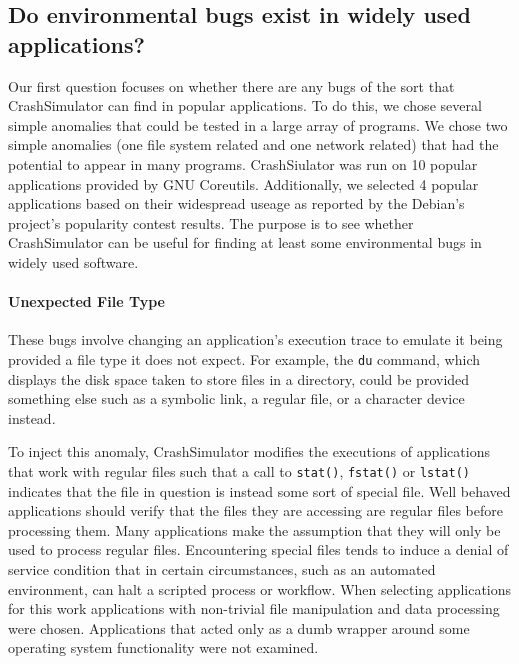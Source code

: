 \subsection{Do environmental bugs  exist in widely used applications?}

Our first question focuses on whether there are any bugs of the sort that
CrashSimulator can find in popular applications.  To do this, we 
chose several simple anomalies that could be tested in a large
array of programs.  We chose two simple anomalies (one file system
related and one network related) that had the potential to appear in
many programs. CrashSiulator was run on 10 popular applications provided by GNU Coreutils.
Additionally, we selected 4 popular applications based on their widespread useage
as reported by the Debian's project's popularity contest results.
The purpose is to see whether CrashSimulator can be useful
for finding at least some environmental bugs in widely used software.


\paragraph{Unexpected File Type}
These bugs involve changing an application's execution trace to emulate it 
being provided a file type it does not expect.  For example, the {\tt du} 
command, which displays the disk space taken to store files in a directory, 
could be provided something else such as a symbolic link, a regular file, or
a character device instead.

To inject this anomaly, CrashSimulator
modifies the executions of applications that work with regular files such that a call to
{\tt stat()}, {\tt fstat()} or {\tt lstat()} indicates that the file in question is instead some sort of special file.
Well behaved applications should verify that the files they are accessing are regular files before processing them.
Many applications make the assumption that they will only be used to process regular files.  Encountering
special files tends to induce a denial of service condition that in certain circumstances, such as an automated
environment, can halt a scripted process or workflow.
When selecting applications for this work applications with non-trivial file manipulation and data
processing were chosen.  Applications that acted only as a dumb wrapper around 
some operating system functionality were not examined.

